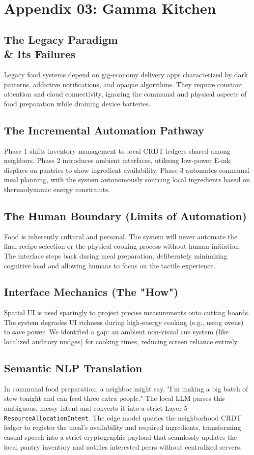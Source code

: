 \chapter{Appendix 03: Gamma Kitchen}

\section{The Legacy Paradigm \\\& Its Failures}
Legacy food systems depend on gig-economy delivery apps characterized by dark patterns, addictive notifications, and opaque algorithms. They require constant attention and cloud connectivity, ignoring the communal and physical aspects of food preparation while draining device batteries.

\section{The Incremental Automation Pathway}
Phase 1 shifts inventory management to local CRDT ledgers shared among neighbors. Phase 2 introduces ambient interfaces, utilizing low-power E-ink displays on pantries to show ingredient availability. Phase 3 automates communal meal planning, with the system autonomously sourcing local ingredients based on thermodynamic energy constraints.

\section{The Human Boundary (Limits of Automation)}
Food is inherently cultural and personal. The system will never automate the final recipe selection or the physical cooking process without human initiation. The interface steps back during meal preparation, deliberately minimizing cognitive load and allowing humans to focus on the tactile experience.

\section{Interface Mechanics (The "How")}
Spatial UI is used sparingly to project precise measurements onto cutting boards. The system degrades UI richness during high-energy cooking (e.g., using ovens) to save power. We identified a gap: an ambient non-visual cue system (like localized auditory nudges) for cooking times, reducing screen reliance entirely.

\section{Semantic NLP Translation}
In communal food preparation, a neighbor might say, "I'm making a big batch of stew tonight and can feed three extra people." The local LLM parses this ambiguous, messy intent and converts it into a strict Layer 5 \texttt{ResourceAllocationIntent}. The edge model queries the neighborhood CRDT ledger to register the meal's availability and required ingredients, transforming casual speech into a strict cryptographic payload that seamlessly updates the local pantry inventory and notifies interested peers without centralized servers.

